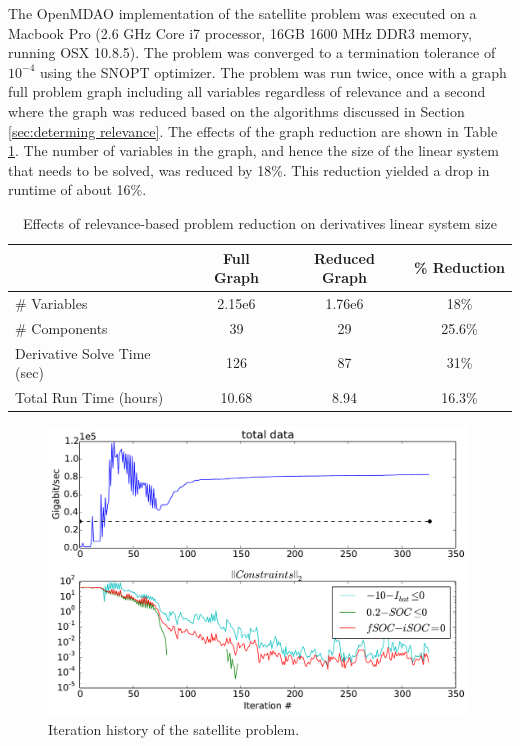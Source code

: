 \documentclass[]{aiaa-tc} %
\begin{document}
            The OpenMDAO implementation of the satellite problem was executed on a
            Macbook Pro (2.6 GHz Core i7 processor, 16GB 1600 MHz DDR3 memory, running OSX 10.8.5).
            The problem was converged to a termination tolerance of $10^{-4}$ using the SNOPT\cite{gill2005snopt} optimizer. 
            The problem was run twice, once with a graph full problem graph including all variables regardless of relevance 
            and a second where the graph was reduced based on the algorithms discussed in Section \ref{sec:determing relevance}. 
            The effects of the graph reduction are shown in Table \ref{tab:cadre-relevance-reduction}. The number of variables in
            the graph, and hence the size of the linear system that needs to be solved, was reduced by 18\%. This reduction 
            yielded a drop in runtime of about 16\%. 


            \begin{table}
                \centering
                \caption{Effects of relevance-based problem reduction on derivatives linear system size}
                  \begin{tabular}{l c c c}
                      \toprule
                                   & Full Graph & Reduced Graph & \% Reduction\\
                      \midrule
                      \# Variables  & 2.15e6 & 1.76e6 & 18\%\\ 
                      \# Components & 39 & 29 & 25.6\%\\ 
                      Derivative Solve Time (sec) & 126 & 87 & 31\%\\ 
                      Total Run Time (hours) & 10.68 & 8.94 & 16.3\%\\ 
                      \bottomrule
                  \end{tabular}    
                \label{tab:cadre-relevance-reduction}
            \end{table}


            \begin{figure}[!htb]
            \centering
            \includegraphics[width=0.99\textwidth]{images/cadre_opt_progress}
            \caption[width=0.22\textwidth]{Iteration history of the satellite problem.
            \label{convergence}
            }
            \end{figure}
\end{document}
